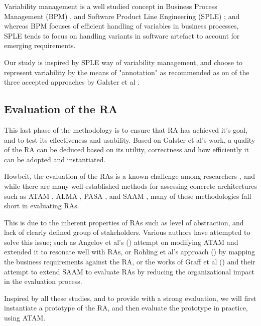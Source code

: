 \documentclass[runningheads]{llncs}
\begin{document}
Variability management is a well studied concept in Business Process Management (BPM) \cite{la2009questionnaire}\cite{rosemann2007configurable}\cite{hallerbach2010capturing}, and Software Product Line Engineering (SPLE) \cite{pohl2005software}\cite{chen2011systematic}\cite{schmid2004customizable}\cite{svahnberg2005taxonomy} \cite{sinnema2006covamof}; and whereas BPM focuses of efficient handling of variables in business processes, SPLE tends to focus on handling variants in software artefact to account for emerging requirements. 

Our study is inspired by SPLE way of variability management, and choose to represent variability by the means of "annotation" as recommended as on of the three accepted approaches by Galster et al \cite{GALSTER}.

\subsection{Evaluation of the RA}

This last phase of the methodology is to ensure that RA has achieved it's goal, and to test its effectiveness and usability. Based on Galster et al's work, a quality of the RA can be deduced based on its utility, correctness and how efficiently it can be adopted and instantiated.  

Howbeit, the evaluation of the RAs is a known challenge among researchers \cite{angelov2008contracting} \cite{Avgeriou} \cite{Cioroaica} \cite{Maier}, and while there are many well-established methods for assessing concrete architectures such as ATAM \cite{KazmanATAM}, ALMA \cite{Bengtsson}, PASA \cite{Williams}, and SAAM \cite{kazman1994saam}, many of these methodologies fall short in evaluating RAs. 

This is due to the inherent properties of RAs such as level of abstraction, and lack of clearly defined group of stakeholders. Various authors have attempted to solve this issue; such as Angelov et al's (\cite{angelov2008towards}) attempt on modifying ATAM and extended it to resonate well with RAs, or Rohling et al's approach (\cite{rohling2019reference}) by mapping the business requirements against the RA, or the works of Graff et al (\cite{graaf2005evaluating}) and their attempt to extend SAAM to evaluate RAs by reducing the organizational impact in the evaluation process.

Inspired by all these studies, and to provide with a strong evaluation, we will first instantiate a prototype of the RA, and then evaluate the prototype in practice, using ATAM. 
\end{document}
